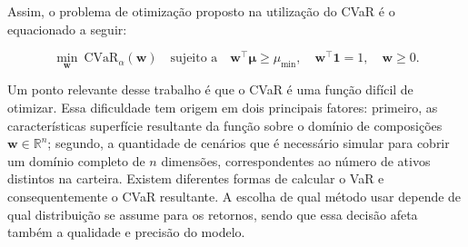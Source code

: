 \documentclass[12pt,a4paper]{article}
\begin{document}
Assim, o problema de otimização proposto na utilização do CVaR é o equacionado a seguir:

\begin{equation}
\min_{\mathbf{w}} \ \mathrm{CVaR}_\alpha(\mathbf{w})
\quad \text{sujeito a} \quad
\mathbf{w}^\top \boldsymbol{\mu} \geq \mu_{\min}, \quad
\mathbf{w}^\top \mathbf{1} = 1, \quad
\mathbf{w} \geq 0.
\label{eq:cvar_opt}
\end{equation}

 Um ponto relevante desse trabalho é que o CVaR é uma função difícil de otimizar. Essa dificuldade tem origem em dois principais fatores: primeiro, as características  superfície resultante da função sobre o domínio de composições $\mathbf{w} \in \mathbb{R}^n$; segundo, a quantidade de cenários que é necessário simular para cobrir um domínio completo de $n$ dimensões, correspondentes ao número de ativos distintos na carteira.  Existem diferentes formas de calcular o VaR e consequentemente o CVaR resultante. A escolha de qual método usar depende de qual distribuição se assume para os retornos, sendo que essa decisão afeta também a qualidade e precisão do modelo. 
 
\end{document}
